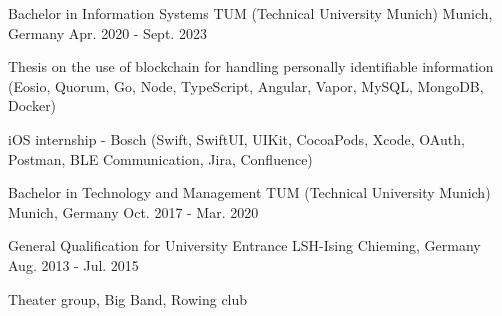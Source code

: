 


\begin{cventries}

\cventry
{Bachelor in Information Systems} %
{TUM (Technical University Munich)} %
{Munich, Germany} %
{Apr. 2020 - Sept. 2023} %
{ %
\begin{cvitems}
\item {Thesis on the use of blockchain for handling personally identifiable information (Eosio, Quorum, Go, Node, TypeScript, Angular, Vapor, MySQL, MongoDB, Docker)}
\item {iOS internship - Bosch (Swift, SwiftUI, UIKit, CocoaPods, Xcode, OAuth, Postman, BLE Communication, Jira, Confluence)}
\end{cvitems}
}

\cventry
{Bachelor in Technology and Management} %
{TUM (Technical University Munich)} %
{Munich, Germany} %
{Oct. 2017 - Mar. 2020} %
{ %
\begin{cvitems}
\end{cvitems}
}

\cventry
{General Qualification for University Entrance} %
{LSH-Ising} %
{Chieming, Germany} %
{Aug. 2013 - Jul. 2015} %
{ %
\begin{cvitems}
\item {Theater group, Big Band, Rowing club}
\end{cvitems}
}



\end{cventries}